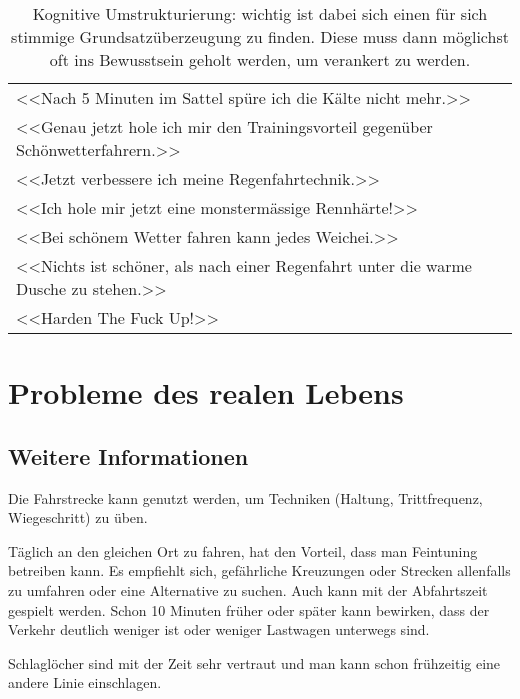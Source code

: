 \documentclass[a4paper,DIV13,BCOR1cm]{scrbook}
\begin{document}
\begin{table}
        \centering
        \begin{tabular}{l}
                \toprule
        <<Nach 5 Minuten im Sattel spüre ich die Kälte nicht mehr.>>\\
        <<Genau jetzt hole ich mir den Trainingsvorteil gegenüber Schönwetterfahrern.>>\\
        <<Jetzt verbessere ich meine Regenfahrtechnik.>>\\
        <<Ich hole mir jetzt eine monstermässige Rennhärte!>>\\
        <<Bei schönem Wetter fahren kann jedes Weichei.>>\\
        <<Nichts ist schöner, als nach einer Regenfahrt unter die warme Dusche zu stehen.>>\\
        <<Harden The Fuck Up!>> \cite[Rule \#5]{velominati2014rules}\\
                \bottomrule
        \end{tabular}
        \caption{Kognitive Umstrukturierung: wichtig ist dabei sich einen für sich stimmige Grundsatzüberzeugung zu finden.
        Diese muss dann möglichst oft ins Bewusstsein geholt werden, um verankert zu werden.}
        \label{tab:kognitiveumstrukturierung}
\end{table}

\chapter{Probleme des realen Lebens}

\section{Weitere Informationen}

Die Fahrstrecke kann genutzt werden, um Techniken (Haltung, Trittfrequenz, Wiegeschritt) zu üben.

Täglich an den gleichen Ort zu fahren, hat den Vorteil, dass man Feintuning betreiben kann.
Es empfiehlt sich, gefährliche Kreuzungen oder Strecken allenfalls zu umfahren oder eine Alternative zu suchen.
Auch kann mit der Abfahrtszeit gespielt werden. Schon 10 Minuten früher oder später kann bewirken, dass der Verkehr deutlich weniger ist oder weniger Lastwagen unterwegs sind.

Schlaglöcher sind mit der Zeit sehr vertraut und man kann schon frühzeitig eine andere Linie einschlagen.
\end{document}
